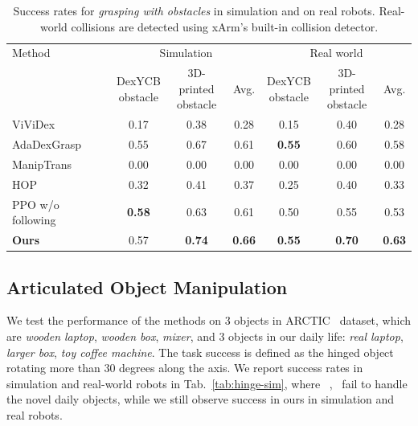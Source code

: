 \documentclass[letterpaper]{article}
\begin{document}
\begin{table}[t]
\centering
\fontsize{9pt}{10.8pt}\selectfont
\renewcommand{\arraystretch}{1.15}
\setlength{\tabcolsep}{3pt}
\begin{tabular*}{\textwidth}{@{\extracolsep{\fill}}lcccccc@{}}
\toprule
Method & \multicolumn{3}{c}{Simulation} & \multicolumn{3}{c}{Real world} \\
\cmidrule(lr){2-4}\cmidrule(lr){5-7}
 & \shortstack{DexYCB\\obstacle} & \shortstack{3D-printed\\obstacle} & Avg. & \shortstack{DexYCB\\obstacle} & \shortstack{3D-printed\\obstacle} & Avg. \\
\midrule
ViViDex~\cite{chen2024vividex} & 0.17 & 0.38 & 0.28 & 0.15 & 0.40 & 0.28 \\
AdaDexGrasp~\cite{shi2025learning} & 0.55 & 0.67 & 0.61 & \textbf{0.55} & 0.60 & 0.58 \\
ManipTrans~\cite{li2025maniptrans} & 0.00 & 0.00 & 0.00 & 0.00 & 0.00 & 0.00 \\
HOP~\cite{singh2024hand} & 0.32 & 0.41 & 0.37 & 0.25 & 0.40 & 0.33 \\
PPO w/o following~\cite{schulman2017proximal} & \textbf{0.58} & 0.63 & 0.61 & 0.50 & 0.55 & 0.53 \\
\midrule
\textbf{Ours} & 0.57 & \textbf{0.74} & \textbf{0.66} & \textbf{0.55} & \textbf{0.70} & \textbf{0.63} \\
\bottomrule
\end{tabular*}
\caption{Success rates for \textit{grasping with obstacles} in simulation and on real robots. Real-world collisions are detected using xArm's built-in collision detector.}
\label{tab:obstacle-sim}
\label{tab:obstacle-real}
\end{table}



\subsection{Articulated Object Manipulation}
We test the performance of the methods on 3 objects in ARCTIC~\cite{fan2023arctic} dataset, which are \textit{wooden laptop}, \textit{wooden box}, \textit{mixer}, and 3 objects in our daily life: \textit{real laptop}, \textit{larger box}, \textit{toy coffee machine}. The task success is defined as the hinged object rotating more than 30 degrees along the axis. We report success rates in simulation and real-world robots in Tab.~\ref{tab:hinge-sim}, where ~\cite{li2025maniptrans},~\cite{chen2024object} fail to handle the novel daily objects, while we still observe success in ours in simulation and real robots.
\end{document}
